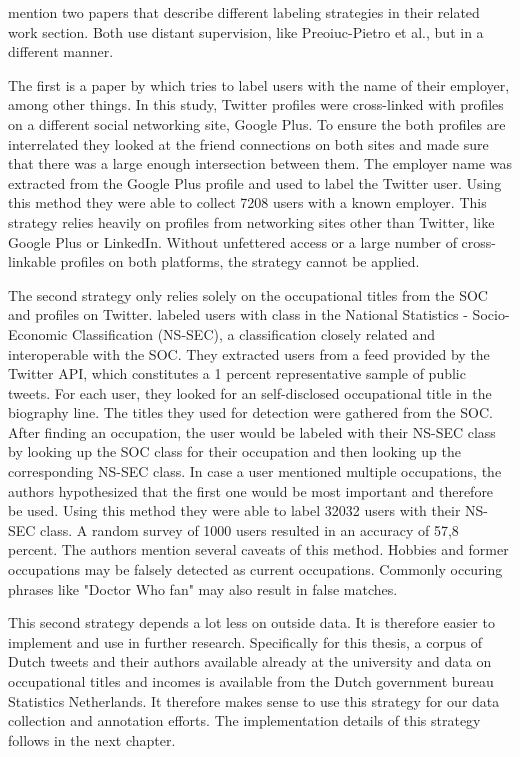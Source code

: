 \documentclass[
10pt, %
a4paper, %
oneside, %
headinclude,footinclude, %
] {book}%
\begin{document}
\cite{pietro} mention two papers that describe different labeling strategies in their related work section. Both use distant supervision, like Preoiuc-Pietro et al., but in a different manner.

The first is a paper by \citet{li} which tries to label users with the name of their employer, among other things. In this study, Twitter profiles were cross-linked with profiles on a different social networking site, Google Plus. To ensure the both profiles are interrelated they looked at the friend connections on both sites and made sure that there was a large enough intersection between them. The employer name was extracted from the Google Plus profile and used to label the Twitter user. Using this method they were able to collect 7208 users with a known employer. 
This strategy relies heavily on profiles from networking sites other than Twitter, like Google Plus or LinkedIn. Without unfettered access or a large number of cross-linkable profiles on both platforms, the strategy cannot be applied.

The second strategy only relies solely on the occupational titles from the SOC and profiles on Twitter. \citet{sloan} labeled users with class in the National Statistics - Socio-Economic Classification (NS-SEC), a classification closely related and interoperable with the SOC. 
They extracted users from a feed provided by the Twitter API, which constitutes a 1 percent representative sample of public tweets. For each user, they looked for an self-disclosed occupational title in the biography line. The titles they used for detection were gathered from the SOC. After finding an occupation, the user would be labeled with their NS-SEC class by looking up the SOC class for their occupation and then looking up the corresponding NS-SEC class. In case a user mentioned multiple occupations, the authors hypothesized that the first one would be most important and therefore be used. 
Using this method they were able to label 32032 users with their NS-SEC class. A random survey of 1000 users resulted in an accuracy of 57,8 percent. The authors mention several caveats of this method. Hobbies and former occupations may be falsely detected as current occupations. Commonly occuring phrases like "Doctor Who fan" may also result in false matches.

This second strategy depends a lot less on outside data. It is therefore easier to implement and use in further research. Specifically for this thesis, a corpus of Dutch tweets and their authors available already at the university and data on occupational titles and incomes is available from the Dutch government bureau Statistics Netherlands. It therefore makes sense to use this strategy for our data collection and annotation efforts. The implementation details of this strategy follows in the next chapter.
\end{document}
